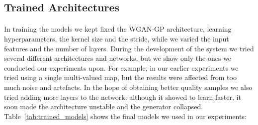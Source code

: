 \newpage
\subsection{Trained Architectures}
\paragraph{} In training the models we kept fixed the WGAN-GP architecture, learning hyperparameters, the kernel size and the stride, while we varied the input features and the number of layers. During the development of the system we tried several different architectures and networks, but we show only the ones we conducted our experiments upon. For example, in our earlier experiments we tried using a single multi-valued map, but the results were affected from too much noise and artefacts. In the hope of obtaining better quality samples we also tried adding more layers to the network: although it showed to learn faster, it soon made the architecture unstable and the generator collapsed. Table~\ref{tab:trained_models} shows the final models we used in our experiments:

